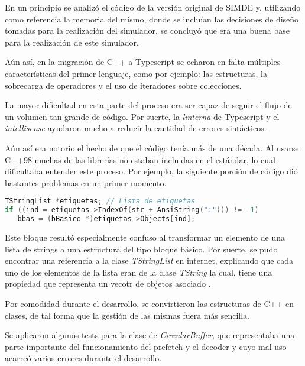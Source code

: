 En un principio se analizó el código de la versión original de SIMDE\cite{SIMDE} y, utilizando como
referencia la memoria del mismo, donde se incluían las decisiones de diseño
tomadas para la realización del simulador, se concluyó que era una buena base para la realización 
de este simulador.

\bigskip
Aún así, en la migración de C++ a Typescript se echaron en falta múltiples características del primer lenguaje,
como por ejemplo: las estructuras, la sobrecarga de operadores y el uso de iteradores sobre colecciones.

\bigskip
La mayor dificultad en esta parte del proceso era ser capaz de seguir el flujo de un volumen tan grande
de código. Por suerte, la \textit{linterna} de Typescript y el \textit{intellisense} ayudaron mucho a reducir la cantidad
de errores sintácticos.

\bigskip
Aún así era notorio el hecho de que el código tenía más de una década. Al usarse C++98 muchas de las librerías
no estaban incluidas en el estándar, lo cual dificultaba entender este proceso. Por ejemplo, la siguiente
porción de código dió bastantes problemas en un primer momento.

\begin{lstlisting}[language=C++]
TStringList *etiquetas; // Lista de etiquetas
if ((ind = etiquetas->IndexOf(str + AnsiString(":"))) != -1)
   bbas = (bBasico *)etiquetas->Objects[ind];
\end{lstlisting}

\bigskip
Este bloque resultó especialmente confuso al transformar un elemento de una lista de strings 
a una estructura del tipo bloque básico. Por suerte, se pudo encontrar una referencia 
a la clase \textit{TStringList} en internet, explicando que cada uno de los elementos de la lista
eran de la clase \textit{TString} la cual, tiene una propiedad que representa un vecotr de objetos
asociado \cite{TStringObjects} .

\bigskip
Por comodidad durante el desarrollo, se convirtieron las estructuras de C++ en clases, de tal forma
que la gestión de las mismas fuera más sencilla.

\bigskip
Se aplicaron algunos tests para la clase de \textit{CircularBuffer}, que representaba una parte importante
del funcionamiento del prefetch y el decoder y cuyo mal uso acarreó varios errores durante el desarrollo.